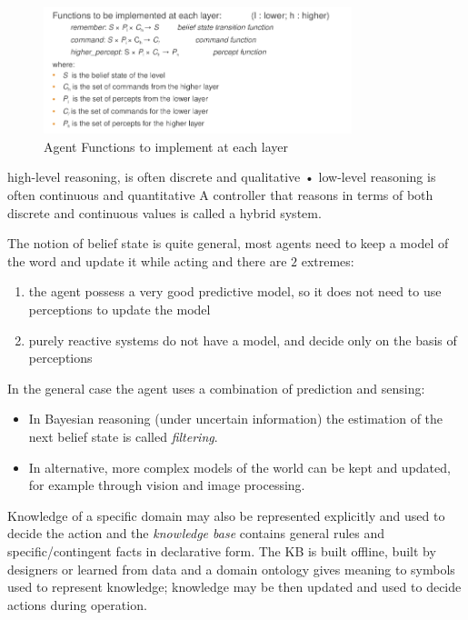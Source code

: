 \begin{figure}
    \includegraphics[width=0.8\textwidth]{Images/agentFunctions}
    \caption{Agent Functions to implement at each layer}
    \label{img:agentFunctions}
\end{figure}
high-level reasoning, is often discrete and qualitative
• low-level reasoning is often continuous and quantitative
A controller that reasons in terms of both discrete and continuous values
is called a hybrid system.

The notion of belief state is quite general, most agents need to keep a model of the word and update it while acting
and there are $2$ extremes:
\begin{enumerate}
    \item the agent possess a very good predictive model, so it does not need to use perceptions to update the model
    \item purely reactive systems do not have a model, and decide only on the basis of perceptions
\end{enumerate}
In the general case the agent uses a combination of prediction and sensing:
\begin{itemize}
    \item In Bayesian reasoning (under uncertain information) the estimation
          of the next belief state is called \emph{filtering}.
    \item In alternative, more complex models of the world can be kept and updated, for
          example through vision and image processing.
\end{itemize}
Knowledge of a specific domain may also be represented explicitly and used to decide the action and 
the \emph{knowledge base} contains general rules and specific/contingent facts in declarative form.\newline
The KB is built offline, built by designers or learned from data and a domain ontology gives meaning
to symbols used to represent knowledge; knowledge may be then updated and used to decide actions during
operation.






